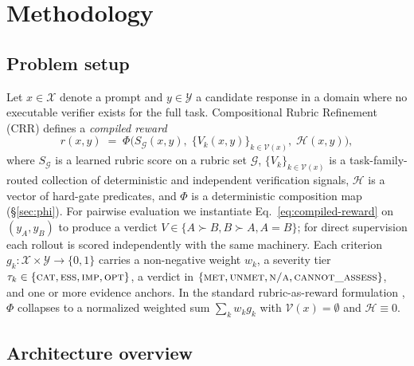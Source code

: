 
\section{Methodology}
\label{sec:methodology}

\subsection{Problem setup}
\label{sec:problem-setup}

Let $x \in \mathcal{X}$ denote a prompt and $y \in \mathcal{Y}$ a candidate
response in a domain where no executable verifier exists for the full
task.  Compositional Rubric Refinement (CRR) defines a \emph{compiled
reward}
%
\begin{equation}
\label{eq:compiled-reward}
r(x, y) \;=\; \Phi\!\Big(
  S_{\mathcal{G}}(x, y),\;
  \{V_k(x, y)\}_{k\in\mathcal{V}(x)},\;
  \mathcal{H}(x, y)
\Big),
\end{equation}
%
where $S_{\mathcal{G}}$ is a learned rubric score on a rubric set
$\mathcal{G}$, $\{V_k\}_{k\in\mathcal{V}(x)}$ is a task-family-routed
collection of deterministic and independent verification signals,
$\mathcal{H}$ is a vector of hard-gate predicates, and $\Phi$ is a
deterministic composition map (\S\ref{sec:phi}).  For pairwise
evaluation we instantiate Eq.~\eqref{eq:compiled-reward} on $(y_A, y_B)$
to produce a verdict $V \in \{A{\succ}B,B{\succ}A,A{=}B\}$; for direct
supervision each rollout is scored independently with the same
machinery.  Each criterion
$g_k\!:\!\mathcal{X}{\times}\mathcal{Y}{\to}\{0,1\}$ carries a
non-negative weight $w_k$, a severity tier
$\tau_k \in \{\textsc{cat},\textsc{ess},\textsc{imp},\textsc{opt}\}$, a
verdict in
$\{\textsc{met},\textsc{unmet},\textsc{n/a},\textsc{cannot\_assess}\}$,
and one or more evidence anchors.  In the standard rubric-as-reward
formulation \citep{gunjal2025rar}, $\Phi$ collapses to a normalized
weighted sum $\sum_k w_k g_k$ with $\mathcal{V}(x){=}\emptyset$ and
$\mathcal{H}{\equiv}0$.

\subsection{Architecture overview}
\label{sec:architecture}


